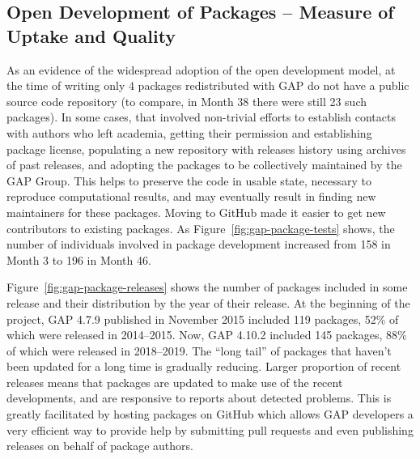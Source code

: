 \subsection{Open Development of \GAP Packages -- Measure of Uptake
  and Quality}
\comment{}

As an evidence of the widespread adoption of the open development model, 
at the time of writing only 4 packages redistributed with GAP do not have a public 
source code repository (to compare, in Month 38 there were still 23 such 
packages). In some cases, that involved non-trivial efforts to establish 
contacts with authors who left academia, getting their permission and 
establishing package license, populating a new repository with releases 
history using archives of past releases, and adopting the packages to
be collectively maintained by the GAP Group. This helps to preserve the
code in usable state, necessary to reproduce computational results, and
may eventually result in finding new maintainers for these packages.
Moving to GitHub made it easier to get new contributors to existing
packages. As Figure~\ref{fig:gap-package-tests}
shows, the number of individuals involved in package development
increased from 158 in Month 3 to 196 in Month 46. 

Figure~\ref{fig:gap-package-releases} shows the number of \GAP packages
included in some \GAP release and their distribution by the year of their
release. At the beginning of the project, GAP 4.7.9 published in November
2015 included 119 packages, 52\% of which were released in 2014--2015.
Now, GAP 4.10.2 included 145 packages, 88\% of which were released in
2018--2019. The ``long tail'' of packages that haven't been updated for
a long time is gradually reducing.
Larger proportion of recent releases means that 
packages are updated to make use of the recent \GAP developments,
and are responsive to reports about detected problems.
This is greatly facilitated by hosting packages on GitHub which 
allows GAP developers a very efficient way to provide help by submitting 
pull requests and even publishing releases on behalf of package authors.

